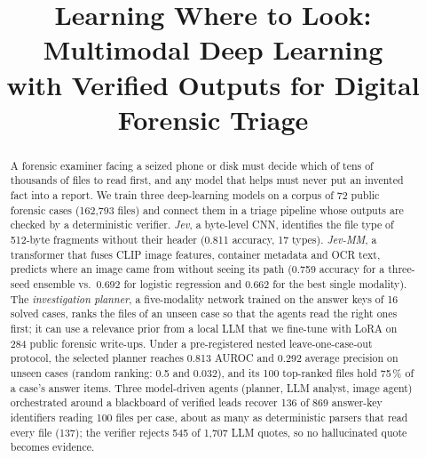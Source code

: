 \documentclass[conference]{IEEEtran}
\begin{document}
\title{Learning Where to Look: Multimodal Deep Learning\\with Verified Outputs for Digital Forensic Triage}

\author{
\and
{}
\and
{}
}

\maketitle

\begin{abstract}
A forensic examiner facing a seized phone or disk must decide which of tens of thousands of files to read first,
and any model that helps must never put an invented fact into a report. We train three deep-learning models on a
corpus of 72 public forensic cases (162{,}793 files) and connect them in a triage pipeline whose outputs are checked
by a deterministic verifier. \emph{Jev}, a byte-level CNN, identifies the file type of 512-byte fragments without
their header (0.811 accuracy, 17 types). \emph{Jev-MM}, a transformer that fuses CLIP image features, container
metadata and OCR text, predicts where an image came from without seeing its path (0.759 accuracy for a three-seed
ensemble vs.\ 0.692 for logistic regression and 0.662 for the best single modality). The \emph{investigation
planner}, a five-modality network trained on the answer keys of 16 solved cases, ranks the files of an unseen case
so that the agents read the right ones first; it can use a relevance prior from a local LLM that we fine-tune with
LoRA on 284 public forensic write-ups. Under a pre-registered nested leave-one-case-out protocol, the selected planner
reaches 0.813 AUROC and 0.292 average precision on unseen cases (random ranking: 0.5 and 0.032), and its 100
top-ranked files hold 75\,\% of a case's answer items. Three model-driven agents (planner, LLM analyst, image agent)
orchestrated around a blackboard of verified leads recover 136 of 869 answer-key identifiers reading 100 files per
case, about as many as deterministic parsers that read every file (137); the verifier rejects 545 of 1{,}707 LLM
quotes, so no hallucinated quote becomes evidence.
\end{abstract}
\end{document}
